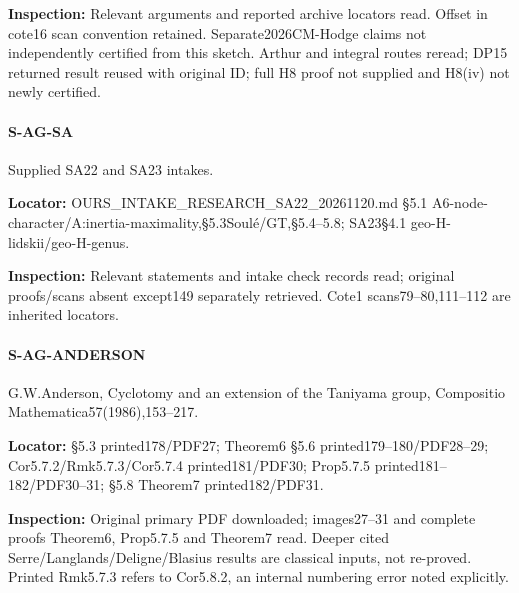 \documentclass[11pt,a4paper]{article}
\begin{document}
\textbf{Inspection:} Relevant arguments and reported archive locators read.\allowbreak{} Offset in cote16 scan convention retained.\allowbreak{} Separate2026CM-Hodge claims not independently certified from this sketch.\allowbreak{} Arthur and integral routes reread; DP15 returned result reused with original ID; full H8 proof not supplied and H8(iv) not newly certified.\allowbreak{}


\paragraph{S-AG-SA} Supplied SA22 and SA23 intakes.

\textbf{Locator:} OURS\_\allowbreak{}INTAKE\_\allowbreak{}RESEARCH\_\allowbreak{}SA22\_\allowbreak{}20261120.\allowbreak{}md §5.\allowbreak{}1 A6-node-character/\allowbreak{}A:\allowbreak{}inertia-maximality,§5.\allowbreak{}3Soulé/\allowbreak{}GT,§5.\allowbreak{}4–\allowbreak{}5.\allowbreak{}8; SA23§4.\allowbreak{}1 geo-H-lidskii/\allowbreak{}geo-H-genus.

\textbf{Inspection:} Relevant statements and intake check records read; original proofs/\allowbreak{}scans absent except149 separately retrieved.\allowbreak{} Cote1 scans79–\allowbreak{}80,111–\allowbreak{}112 are inherited locators.\allowbreak{}


\paragraph{S-AG-ANDERSON} G.\allowbreak{}W.\allowbreak{}Anderson, Cyclotomy and an extension of the Taniyama group, Compositio Mathematica57(1986),153–\allowbreak{}217.

\textbf{Locator:} §5.\allowbreak{}3 printed178/\allowbreak{}PDF27; Theorem6 §5.\allowbreak{}6 printed179–\allowbreak{}180/\allowbreak{}PDF28–\allowbreak{}29; Cor5.\allowbreak{}7.\allowbreak{}2/\allowbreak{}Rmk5.\allowbreak{}7.\allowbreak{}3/\allowbreak{}Cor5.\allowbreak{}7.\allowbreak{}4 printed181/\allowbreak{}PDF30; Prop5.\allowbreak{}7.\allowbreak{}5 printed181–\allowbreak{}182/\allowbreak{}PDF30–\allowbreak{}31; §5.\allowbreak{}8 Theorem7 printed182/\allowbreak{}PDF31.

\textbf{Inspection:} Original primary PDF downloaded; images27–\allowbreak{}31 and complete proofs Theorem6, Prop5.\allowbreak{}7.\allowbreak{}5 and Theorem7 read.\allowbreak{} Deeper cited Serre/\allowbreak{}Langlands/\allowbreak{}Deligne/\allowbreak{}Blasius results are classical inputs, not re-proved.\allowbreak{} Printed Rmk5.\allowbreak{}7.\allowbreak{}3 refers to Cor5.\allowbreak{}8.\allowbreak{}2, an internal numbering error noted explicitly.\allowbreak{}
\end{document}
